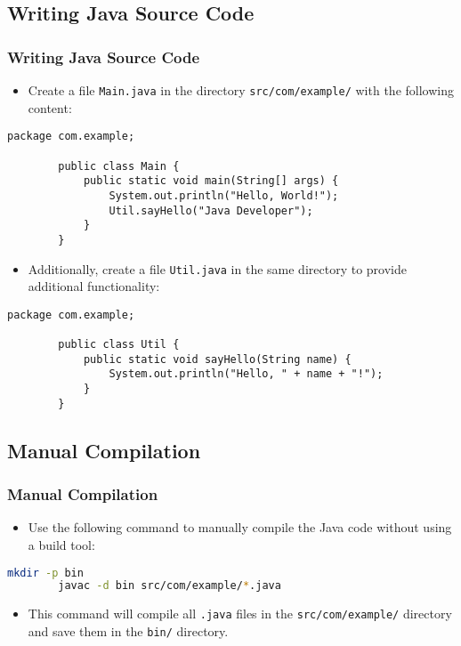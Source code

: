 \documentclass[aspectratio=169, table]{beamer}
\begin{document}
\subsection{Writing Java Source Code}

\begin{frame}[fragile]
	\vspace{20pt}
	\frametitle{Writing Java Source Code}
	\begin{itemize}
		\item Create a file \texttt{Main.java} in the directory \texttt{src/com/example/} with the following content:
	\end{itemize}
	\begin{lstlisting}[style=JavaStyle]
		package com.example;
		
		public class Main {
			public static void main(String[] args) {
				System.out.println("Hello, World!");
				Util.sayHello("Java Developer");
			}
		}
	\end{lstlisting}
	\begin{itemize}
		\item Additionally, create a file \texttt{Util.java} in the same directory to provide additional functionality:
	\end{itemize}
	\begin{lstlisting}[style=JavaStyle]
		package com.example;
		
		public class Util {
			public static void sayHello(String name) {
				System.out.println("Hello, " + name + "!");
			}
		}
	\end{lstlisting}
\end{frame}

\subsection{Manual Compilation}

\begin{frame}[fragile]
	\frametitle{Manual Compilation}
	\begin{itemize}
		\item Use the following command to manually compile the Java code without using a build tool:
	\end{itemize}
	\begin{lstlisting}[language=bash]
		mkdir -p bin
		javac -d bin src/com/example/*.java
	\end{lstlisting}
	\begin{itemize}
		\item This command will compile all \texttt{.java} files in the \texttt{src/com/example/} directory and save them in the \texttt{bin/} directory.
	\end{itemize}
\end{frame}
\end{document}
